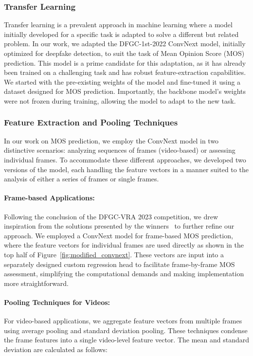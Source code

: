 \documentclass[a4paper,12pt,openright]{book}
\begin{document}
\subsubsection{Transfer Learning}

Transfer learning is a prevalent approach in machine learning where a model initially developed for a specific task is adapted to solve a different but related problem. In our work, we adapted the DFGC-1st-2022 ConvNext model, initially optimized for deepfake detection, to suit the task of Mean Opinion Score (MOS) prediction. This model is a prime candidate for this adaptation, as it has already been trained on a challenging task and has robust feature-extraction capabilities. We started with the pre-existing weights of the model and fine-tuned it using a dataset designed for MOS prediction. Importantly, the backbone model's weights were not frozen during training, allowing the model to adapt to the new task. 

\subsubsection{Feature Extraction and Pooling Techniques}

In our work on MOS prediction, we employ the ConvNext model in two distinctive scenarios: analyzing sequences of frames (video-based) or assessing individual frames. To accommodate these different approaches, we developed two versions of the model, each handling the feature vectors in a manner suited to the analysis of either a series of frames or single frames.

\paragraph{Frame-based Applications:}
Following the conclusion of the DFGC-VRA 2023 competition, we drew inspiration from the solutions presented by the winners~\cite{peng_etal_2023} to further refine our approach. We employed a ConvNext model for frame-based MOS prediction, where the feature vectors for individual frames are used directly as shown in the top half of Figure~\ref{fig:modified_convnext}. These vectors are input into a separately designed custom regression head to facilitate frame-by-frame MOS assessment, simplifying the computational demands and making implementation more straightforward.
\newpage
\paragraph{Pooling Techniques for Videos:}
For video-based applications, we aggregate feature vectors from multiple frames using average pooling and standard deviation pooling. These techniques condense the frame features into a single video-level feature vector. The mean and standard deviation are calculated as follows:
\end{document}
